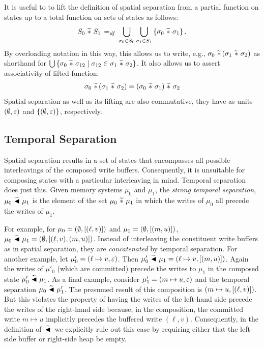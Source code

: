 \documentclass[11pt]{report}
\begin{document}
It is useful to to lift the definition of spatial separation from a partial function on states up to a total function on sets of states as follows: \[ S_0 \operatorname{\,\widetilde{\ast}\,} S_1 \operatorname{\;=_{\mathit{df}}\;} \bigcup_{\sigma_0 \in S_0} \bigcup_{\sigma_1 \in S_1} \left\lbrace \sigma_0 \operatorname{\,\widetilde{\ast}\,} \sigma_1 \right\rbrace.\] By overloading notation in this way, this allows us to write, e.g., $\sigma_0 \operatorname{\,\widetilde{\ast}\,} (\sigma_1 \operatorname{\,\widetilde{\ast}\,} \sigma_2)$ as shorthand for $\bigcup \left\lbrace \sigma_0 \operatorname{\,\widetilde{\ast}\,} \sigma_{12} \mid \sigma_{12} \in \sigma_1 \operatorname{\,\widetilde{\ast}\,} \sigma_2 \right\rbrace$. It also allows us to assert associativity of lifted function: \[ \sigma_0 \operatorname{\,\widetilde{\ast}\,} (\sigma_1 \operatorname{\,\widetilde{\ast}\,} \sigma_2) = (\sigma_0 \operatorname{\,\widetilde{\ast}\,} \sigma_1) \operatorname{\,\widetilde{\ast}\,} \sigma_2 \] Spatial separation as well as its lifting are also commutative, they have as units $(\operatorname{\emptyset},\varepsilon)$ and $\left\lbrace (\operatorname{\emptyset},\varepsilon) \right\rbrace$, respectively. 

\subsection{Temporal Separation}
\label{sec:sequential-temporal-separation}

Spatial separation results in a set of states that encompasses all possible interleavings of the composed write buffers. Consequently, it is unsuitable for composing states with a particular interleaving in mind. Temporal separation does just this. Given memory systems $\mu_0$ and $\mu_1$, the \emph{strong temporal separation}, $\mu_0 \operatorname{\,\widetilde{\blacktriangleleft}\,} \mu_1$ is the element of the set $\mu_0 \operatorname{\,\widetilde{\ast}\,} \mu_1$ in which the writes of $\mu_0$ all precede the writes of $\mu_1$. 

For example, for $\mu_0 = (\operatorname{\emptyset},\left[(\ell,v)\right])$ and $\mu_1 = (\operatorname{\emptyset},\left[(m,u)\right])$, $\mu_0 \operatorname{\,\widetilde{\blacktriangleleft}\,} \mu_1 = (\operatorname{\emptyset},\left[(\ell,v),(m,u)\right])$. Instead of interleaving the constituent write buffers as in spatial separation, they are \emph{concatenated} by temporal separation. For another example, let $\mu'_0 = (\ell \mapsto v, \varepsilon)$. Then $\mu'_0 \operatorname{\,\widetilde{\blacktriangleleft}\,} \mu_1 = (\ell \mapsto v, \left[(m,u)\right])$. Again the writes of $\mu'_0$ (which are committed) precede the writes to $\mu_1$ in the composed state $\mu'_0 \operatorname{\,\widetilde{\blacktriangleleft}\,} \mu_1$. As a final example, consider $\mu'_1 = (m \mapsto u, \varepsilon)$ and the temporal separation $\mu_0 \operatorname{\,\widetilde{\blacktriangleleft}\,} \mu'_1$. The presumed result of this composition is $(m \mapsto u, \left[(\ell,v)\right])$. But this violates the property of having the writes of the left-hand side precede the writes of the right-hand side because, in the composition, the committed write $m \mapsto u$ implicitly precedes the buffered write $(\ell,v)$. Consequently, in the definition of $\operatorname{\,\widetilde{\blacktriangleleft}\,}$ we explicitly rule out this case by requiring either that the left-side buffer or right-side heap be empty. 
\end{document}

